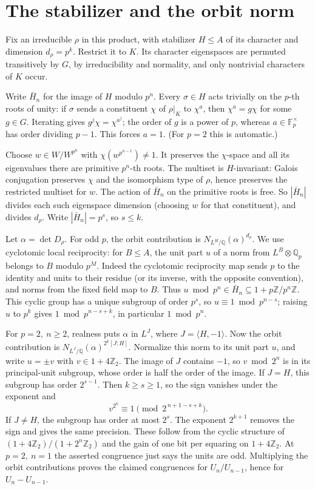 \documentclass[11pt]{article}
\newcommand{\Z}{\mathbb Z}
\newcommand{\F}{\mathbb F}
\newcommand{\Q}{\mathbb Q}
\begin{document}
\section{The stabilizer and the orbit norm}
Fix an irreducible \(\rho\) in this product, with stabilizer \(H\le A\)
of its character and dimension \(d_\rho=p^k\).
Restrict it to \(K\). Its character eigenspaces are permuted transitively
by \(G\), by irreducibility and normality, and only nontrivial
characters of \(K\) occur.

Write \(\bar H_n\) for the image of \(H\) modulo \(p^n\).
Every \(\sigma\in H\) acts trivially on the \(p\)-th roots of unity:
if \(\sigma\) sends a constituent \(\chi\) of \(\rho|_K\) to \(\chi^a\),
then \(\chi^a=g\chi\) for some \(g\in G\).
Iterating gives \(g^j\chi=\chi^{a^j}\); the order of \(g\) is
a power of \(p\), whereas \(a\in\F_p^\times\) has order dividing \(p-1\).
This forces \(a=1\). (For \(p=2\) this is automatic.)

Choose \(w\in W/W^{p^n}\) with \(\chi(w^{p^{n-1}})\ne1\).
It preserves the \(\chi\)-space and all its eigenvalues there are
primitive \(p^n\)-th roots. The multiset is \(H\)-invariant:
Galois conjugation preserves \(\chi\) and the isomorphism type of
\(\rho\), hence preserves the restricted multiset for \(w\).
The action of \(\bar H_n\) on the primitive roots is free. So
\(|\bar H_n|\) divides each such eigenspace dimension (choosing \(w\)
for that constituent), and divides \(d_\rho\). Write
\(|\bar H_n|=p^s\), so \(s\le k\).

Let \(\alpha=\det D_\rho\).
For odd \(p\), the orbit contribution is \(N_{L^H/\Q}(\alpha)^{d_\rho}\).
We use cyclotomic local reciprocity: for \(B\le A\), the unit part \(u\)
of a norm from \(L^B\otimes\Q_p\) belongs to \(B\) modulo \(p^M\).
Indeed the cyclotomic reciprocity map sends \(p\) to the identity
and units to their residue (or its inverse, with the opposite
convention), and norms from the fixed field map to \(B\).
Thus \(u\bmod p^n\in\bar H_n\subseteq 1+p\Z/p^n\Z\).
This cyclic group has a unique subgroup of order \(p^s\), so
\(u\equiv1\bmod p^{n-s}\); raising \(u\) to \(p^k\) gives
\(1\bmod p^{n-s+k}\), in particular \(1\bmod p^n\).

For \(p=2,\ n\ge2\), realness puts \(\alpha\) in \(L^J\), where
\(J=\langle H,-1\rangle\). Now the orbit contribution is
\(N_{L^J/\Q}(\alpha)^{2^k[J:H]}\).
Normalize this norm to its unit part \(u\), and write \(u=\pm v\) with
\(v\in1+4\Z_2\). The image of \(J\) contains \(-1\), so \(v\bmod2^n\)
is in its principal-unit subgroup, whose order is half the order of
the image. If \(J=H\), this subgroup has order \(2^{s-1}\).
Then \(k\ge s\ge1\), so the sign vanishes under the exponent and
\[
 v^{2^k}\equiv1\pmod{2^{\,n+1-s+k}}.
\]
If \(J\ne H\), the subgroup has order at most \(2^s\).
The exponent \(2^{k+1}\) removes the sign and gives the same
precision. These follow from the cyclic structure of
\((1+4\Z_2)/(1+2^n\Z_2)\) and the gain of one bit per squaring on
\(1+4\Z_2\).
At \(p=2,\ n=1\) the asserted congruence just says the units are odd.
Multiplying the orbit contributions proves the claimed congruences
for \(U_n/U_{n-1}\), hence for \(U_n-U_{n-1}\).
\end{document}

